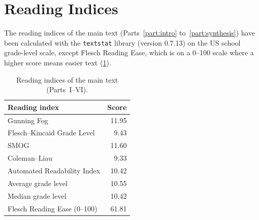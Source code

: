 \clearpage
\section{Reading Indices}
\label{app:reading-indices}

The reading indices of the main text (Parts~\ref{part:intro} to~\ref{part:synthesis}) have been calculated with the \texttt{textstat} library (version 0.7.13) on the US school grade-level scale, except Flesch Reading Ease, which is on a 0--100 scale where a higher score means easier text (\cref{tab:reading-indices}).

\begin{table}[htbp]
    \centering
    \caption[Reading indices of the main text]{Reading indices of the main text (Parts~I--VI).}
    \label{tab:reading-indices}
    \begin{tabular}{@{}lr@{}}
        \toprule
        \textbf{Reading index} & \textbf{Score} \\
        \midrule
        Gunning Fog & 11.95 \\
        Flesch--Kincaid Grade Level & 9.43 \\
        SMOG & 11.60 \\
        Coleman--Liau & 9.33 \\
        Automated Readability Index & 10.42 \\
        \midrule
        Average grade level & 10.55 \\
        Median grade level & 10.42 \\
        \midrule
        Flesch Reading Ease (0--100) & 61.81 \\
        \bottomrule
    \end{tabular}
\end{table}
